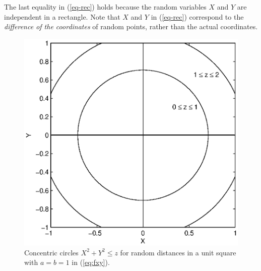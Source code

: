 \documentclass[12pt,draftclsnofoot,onecolumn]{IEEEtran}
\begin{document}
The last equality in (\ref{eq-rec}) holds because the random variables
$X$ and $Y$ are independent in a rectangle.
Note that $X$ and $Y$ in (\ref{eq-rec}) correspond to the \textit{difference of the coordinates} of random points,
rather than the actual coordinates.
%

\begin{figure}
  \centering
  \includegraphics[width=0.5\columnwidth]{fig/square_within}
  \caption{Concentric circles $X^2+Y^2 \leq z$ for random distances in a unit square
  with $a=b=1$ in (\ref{eq:fxy}).}
  \label{fig:square}
\end{figure}
\end{document}
